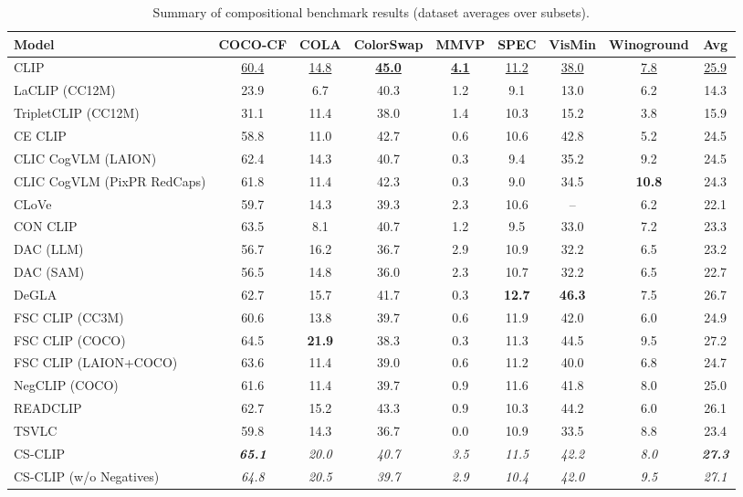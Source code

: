 \begin{table}[t]
  \centering
  \scriptsize
  \caption{Summary of compositional benchmark results (dataset averages over subsets).}
  \label{tab:summary_compositional}
  \begin{adjustbox}{max width=\textwidth}
  \setlength{\tabcolsep}{2pt}
  \begin{tabular}{lcccccccc}
    \toprule
    Model & COCO-CF & COLA & ColorSwap & MMVP & SPEC & VisMin & Winoground & Avg \\
    \midrule
    CLIP & \underline{60.4} & \underline{14.8} & \underline{\textbf{45.0}} & \underline{\textbf{4.1}} & \underline{11.2} & \underline{38.0} & \underline{7.8} & \underline{25.9} \\
    \midrule
    LaCLIP (CC12M) & 23.9 & 6.7 & 40.3 & 1.2 & 9.1 & 13.0 & 6.2 & 14.3 \\
    TripletCLIP (CC12M) & 31.1 & 11.4 & 38.0 & 1.4 & 10.3 & 15.2 & 3.8 & 15.9 \\
    \midrule
    CE CLIP & 58.8 & 11.0 & 42.7 & 0.6 & 10.6 & 42.8 & 5.2 & 24.5 \\
    CLIC CogVLM (LAION) & 62.4 & 14.3 & 40.7 & 0.3 & 9.4 & 35.2 & 9.2 & 24.5 \\
    CLIC CogVLM (PixPR RedCaps) & 61.8 & 11.4 & 42.3 & 0.3 & 9.0 & 34.5 & \textbf{10.8} & 24.3 \\
    CLoVe & 59.7 & 14.3 & 39.3 & 2.3 & 10.6 & -- & 6.2 & 22.1 \\
    CON CLIP & 63.5 & 8.1 & 40.7 & 1.2 & 9.5 & 33.0 & 7.2 & 23.3 \\
    DAC (LLM) & 56.7 & 16.2 & 36.7 & 2.9 & 10.9 & 32.2 & 6.5 & 23.2 \\
    DAC (SAM) & 56.5 & 14.8 & 36.0 & 2.3 & 10.7 & 32.2 & 6.5 & 22.7 \\
    DeGLA & 62.7 & 15.7 & 41.7 & 0.3 & \textbf{12.7} & \textbf{46.3} & 7.5 & 26.7 \\
    FSC CLIP (CC3M) & 60.6 & 13.8 & 39.7 & 0.6 & 11.9 & 42.0 & 6.0 & 24.9 \\
    FSC CLIP (COCO) & 64.5 & \textbf{21.9} & 38.3 & 0.3 & 11.3 & 44.5 & 9.5 & 27.2 \\
    FSC CLIP (LAION+COCO) & 63.6 & 11.4 & 39.0 & 0.6 & 11.2 & 40.0 & 6.8 & 24.7 \\
    NegCLIP (COCO) & 61.6 & 11.4 & 39.7 & 0.9 & 11.6 & 41.8 & 8.0 & 25.0 \\
    READCLIP & 62.7 & 15.2 & 43.3 & 0.9 & 10.3 & 44.2 & 6.0 & 26.1 \\
    TSVLC & 59.8 & 14.3 & 36.7 & 0.0 & 10.9 & 33.5 & 8.8 & 23.4 \\
    \midrule
    CS-CLIP & \emph{\textbf{65.1}} & \emph{20.0} & \emph{40.7} & \emph{3.5} & \emph{11.5} & \emph{42.2} & \emph{8.0} & \emph{\textbf{27.3}} \\
    CS-CLIP (w/o Negatives) & \emph{64.8} & \emph{20.5} & \emph{39.7} & \emph{2.9} & \emph{10.4} & \emph{42.0} & \emph{9.5} & \emph{27.1} \\
    \bottomrule
  \end{tabular}
  \end{adjustbox}
\end{table}

